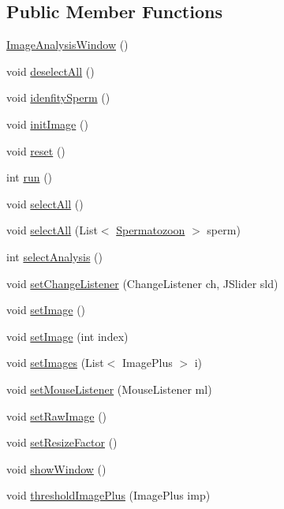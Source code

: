 \subsection*{Public Member Functions}
\begin{DoxyCompactItemize}
\item 
\hyperlink{classgui_1_1_image_analysis_window_a92a9acda5cd7fb137046e8ad2ba902a8}{Image\+Analysis\+Window} ()
\item 
void \hyperlink{classgui_1_1_image_analysis_window_a2d0abb2ca6c5355bd49023f16f185293}{deselect\+All} ()
\item 
void \hyperlink{classgui_1_1_image_analysis_window_ad0b8b85815ec344419394b160098d9a7}{idenfity\+Sperm} ()
\item 
void \hyperlink{classgui_1_1_image_analysis_window_a2ef8b75d07db675fb28ce54cc00713f0}{init\+Image} ()
\item 
void \hyperlink{classgui_1_1_image_analysis_window_ad20897c5c8bd47f5d4005989bead0e55}{reset} ()
\item 
int \hyperlink{classgui_1_1_image_analysis_window_a58e8be2db2660128e4e6456a9c981fb5}{run} ()
\item 
void \hyperlink{classgui_1_1_image_analysis_window_ab6658ed404200bd7aaca5629db064645}{select\+All} ()
\item 
void \hyperlink{classgui_1_1_image_analysis_window_aae663b9e2c200d48d0c146871ef96f6c}{select\+All} (List$<$ \hyperlink{classdata_1_1_spermatozoon}{Spermatozoon} $>$ sperm)
\item 
int \hyperlink{classgui_1_1_image_analysis_window_a0f3cd690d3cb4c7088975fa0ae8f747a}{select\+Analysis} ()
\item 
void \hyperlink{classgui_1_1_image_analysis_window_a8743638e7e3c13bddb254fe35d03cf2b}{set\+Change\+Listener} (Change\+Listener ch, J\+Slider sld)
\item 
void \hyperlink{classgui_1_1_image_analysis_window_a3e14b1197961eed6fd530110e15380ec}{set\+Image} ()
\item 
void \hyperlink{classgui_1_1_image_analysis_window_a04b5ca8d2004b3a622268e038a238455}{set\+Image} (int index)
\item 
void \hyperlink{classgui_1_1_image_analysis_window_a68997c66ca7a19a6676411bba4640aef}{set\+Images} (List$<$ Image\+Plus $>$ i)
\item 
void \hyperlink{classgui_1_1_image_analysis_window_a966ff4422076de6f1bb590cdcbbb03ca}{set\+Mouse\+Listener} (Mouse\+Listener ml)
\item 
void \hyperlink{classgui_1_1_image_analysis_window_a612d8bbeb78a27050cf59d9db734fc11}{set\+Raw\+Image} ()
\item 
void \hyperlink{classgui_1_1_image_analysis_window_aa8880ccb12f2638822de16dd50e9c6d1}{set\+Resize\+Factor} ()
\item 
void \hyperlink{classgui_1_1_image_analysis_window_aae02cc4cef6bcbb0d78251146784b058}{show\+Window} ()
\item 
void \hyperlink{classgui_1_1_image_analysis_window_a4d06082b25cf59e18ad8de7e5969b863}{threshold\+Image\+Plus} (Image\+Plus imp)
\end{DoxyCompactItemize}
